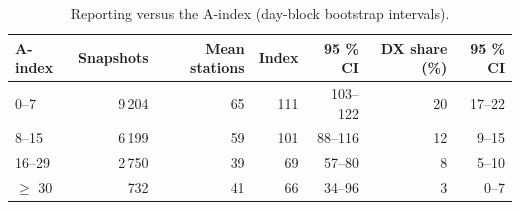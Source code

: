 \begin{table}[htbp]\centering\small
\caption{Reporting versus the A-index (day-block bootstrap intervals).}\label{tab:a}
\begin{tabular}{lrrrrrr}
\toprule
A-index & Snapshots & Mean stations & Index & 95 \% CI & DX share (\%) & 95 \% CI \\
\midrule
0--7 & 9\,204 & 65 & 111 & 103--122 & 20 & 17--22 \\
8--15 & 6\,199 & 59 & 101 & 88--116 & 12 & 9--15 \\
16--29 & 2\,750 & 39 & 69 & 57--80 & 8 & 5--10 \\
$\geq$ 30 & 732 & 41 & 66 & 34--96 & 3 & 0--7 \\
\bottomrule
\end{tabular}
\end{table}
